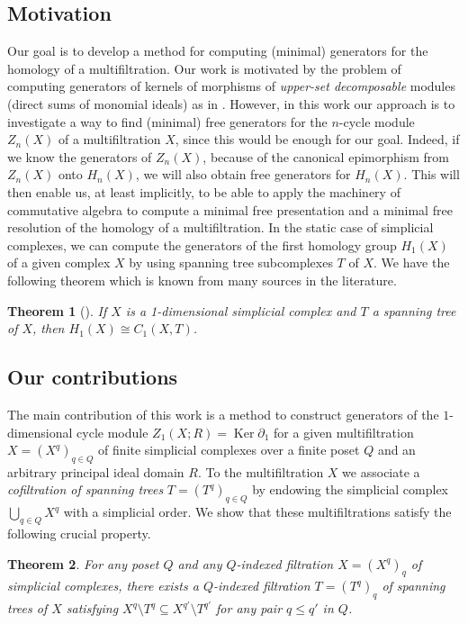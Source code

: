 \documentclass[oneside]{amsart}
\newtheorem{theorem}{Theorem}
\theoremstyle{definition}
\DeclareMathOperator\Ker{Ker}
\begin{document}
\subsection{Motivation}
Our goal is to develop a method for computing (minimal) generators for the homology of a multifiltration.
Our work is motivated by the problem of computing generators of kernels of morphisms of \emph{upper-set decomposable} modules (direct sums of monomial ideals) as in \cite{ChachólskiScolamieroVaccarino2017}.
However, in this work our approach is to investigate a way to find (minimal) free generators for the $n$-cycle module $Z_n(X)$ of a multifiltration $X$, since this would be enough for our goal.
Indeed, if we know the generators of $Z_n(X)$, because of the canonical epimorphism from $Z_n(X)$ onto $H_n(X)$, we will also obtain free generators for $H_n(X)$.
This will then enable us, at least implicitly, to be able to apply the machinery of commutative algebra to compute a minimal free presentation and a minimal free resolution of the homology of a multifiltration. 
In the static case of simplicial complexes, we can compute the generators of the first homology group $H_1(X)$ of a given complex $X$ by using spanning tree subcomplexes $T$ of $X$.
We have the following theorem which is known from many sources in the literature.
 
\begin{theorem}[\cite{Kozlov2020,Spanier1982}]
    If $X$ is a 1-dimensional simplicial complex and $T$ a spanning tree of $X$, then $H_1(X) \cong C_1(X, T)$.
\end{theorem}

\subsection{Our contributions}

The main contribution of this work is a method to construct generators of the $1$-dimensional cycle module $Z_1(X; R) = \Ker \partial_1$ for a given multifiltration $X = (X^q)_{q \in Q}$ of finite simplicial complexes over a finite poset $Q$ and an arbitrary principal ideal domain $R$.
To the multifiltration $X$ we associate a \emph{cofiltration of spanning trees} $T = (T^q)_{q \in Q}$ by endowing the simplicial complex $\bigcup_{q \in Q} X^q$ with a simplicial order.
We show that these multifiltrations satisfy the following crucial property.
\begin{theorem}
    \label{theorem:IntroMainResult}
    For any poset $Q$ and any $Q$-indexed filtration $X = (X^q)_q$ of simplicial complexes, there exists a $Q$-indexed filtration $T = (T^q)_q$ of spanning trees of $X$ satisfying $X^q \setminus T^q \subseteq X^{q'} \setminus T^{q'}$ for any pair $q \leq q'$ in $Q$.
\end{theorem}
\end{document}
